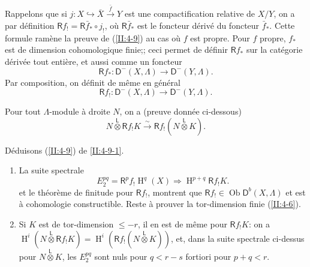 \documentclass{book}
\DeclareMathOperator{\h}{H}
\DeclareMathOperator{\ob}{Ob}
\newcommand{\iso}{\xrightarrow\sim}
\newcommand{\R}{\mathsf{R}}
\newcommand{\D}{\mathsf{D}}
\newcommand{\lotimes}{{\overset{\mathsf{L}}{\otimes}}}
\begin{document}
Rappelons que si $j:X\hookrightarrow \bar X \xrightarrow{\bar f} Y$ est une 
compactification relative de $X/Y$, on a par d\'efinition 
$\R f_! = \R \bar f_* \circ j_!$, o\`u $\R \bar f_*$ est le foncteur d\'eriv\'e 
du foncteur $\bar f_*$. Cette formule ram\`ene la preuve de (\ref{II:4-9}) 
au cas o\`u $f$ est propre. Pour $f$ propre, $f_*$ est de dimension 
cohomologique finie;; ceci permet de d\'efinir $\R f_*$ sur la cat\'egorie 
d\'eriv\'ee tout enti\`ere, et aussi comme un foncteur 
\[
  \R f_* : \D^-(X,\Lambda) \to \D^-(Y,\Lambda) \text{.}
\]
Par composition, on d\'efinit de m\^eme en g\'en\'eral 
\[
  \R f_! : \D^-(X,\Lambda) \to \D^-(Y,\Lambda) \text{.}
\]

Pour tout $\Lambda$-module \`a droite $N$, on a (preuve donn\'ee ci-dessous) 
\begin{equation}\label{II:eq:4-9-1}
  N\lotimes \R f_! K \iso \R f_! (N\lotimes K) \text{.}
\end{equation}

D\'eduisons (\ref{II:4-9}) de \eqref{II:4-9-1}. 
\begin{enumerate}[\indent a)]
  \item La suite spectrale 
    \[
      E_2^{p q} = \R^p f_! \h^q(X) \Rightarrow \h^{p+q} \R f_! K \text{.}
    \]
    et le th\'eor\`eme de finitude pour $\R f_!$, montrent que 
    $\R f_!\in \ob \D^b(X,\Lambda)$ et est \`a cohomologie constructible. 
    Reste \`a prouver la tor-dimension finie (\ref{II:4-6}). 
  \item Si $K$ est de tor-dimension $\leqslant -r$, il en est de m\^eme pour 
    $\R f_! K$: on a $\h^i(N\lotimes \R f_! K) = \h^i(\R f_!(N\lotimes K))$, 
    et, dans la suite spectrale ci-dessus pour $N\lotimes K$, les 
    $E_2^{p q}$ sont nuls pour $q<r-s$ fortiori pour $p+q<r$. 
\end{enumerate}
\end{document}
